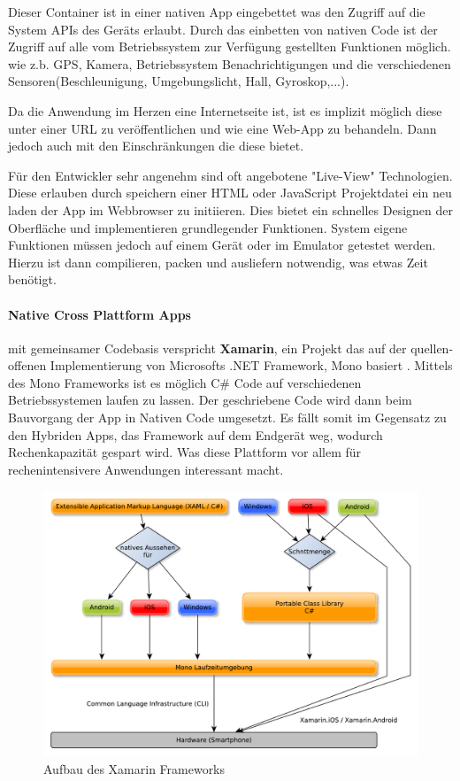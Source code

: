 Dieser Container ist in einer nativen App eingebettet was den Zugriff auf die System APIs des Geräts erlaubt. Durch das einbetten von nativen Code ist der Zugriff auf alle vom Betriebssystem zur Verfügung gestellten Funktionen möglich. wie z.b. GPS, Kamera, Betriebssystem Benachrichtigungen und die verschiedenen Sensoren(Beschleunigung, Umgebungslicht, Hall, Gyroskop,...). 

Da die Anwendung im Herzen eine Internetseite ist, ist es implizit möglich diese unter einer URL zu veröffentlichen und wie eine Web-App zu behandeln. Dann jedoch auch mit den Einschränkungen die diese bietet.

Für den Entwickler sehr angenehm sind oft angebotene "Live-View" Technologien. Diese erlauben durch speichern einer HTML oder JavaScript Projektdatei ein neu laden der App im Webbrowser zu initiieren. Dies bietet ein schnelles Designen der Oberfläche und implementieren grundlegender Funktionen. System eigene Funktionen müssen jedoch auf einem Gerät oder im Emulator getestet werden. Hierzu ist dann compilieren, packen und ausliefern notwendig, was etwas Zeit benötigt.

\paragraph{Native Cross Plattform Apps} mit gemeinsamer Codebasis verspricht \textbf{Xamarin}, ein Projekt das auf der quellen-offenen Implementierung von Microsofts .NET Framework, Mono basiert \cite{MONO16}. Mittels des Mono Frameworks ist es möglich C\# Code auf verschiedenen Betriebssystemen laufen zu lassen. Der geschriebene Code wird dann beim Bauvorgang der App in Nativen Code umgesetzt. Es fällt somit im Gegensatz zu den Hybriden Apps, das Framework auf dem Endgerät weg, wodurch Rechenkapazität gespart wird. Was diese Plattform vor allem für rechenintensivere Anwendungen interessant macht.

\begin{figure}[H]
	\centering
	\includegraphics[scale=0.58]{images/Xamarin}
	\caption[Aufbau des Xamarin Frameworks]{Aufbau des Xamarin Frameworks}
	\label{XamarinBild}
\end{figure}

